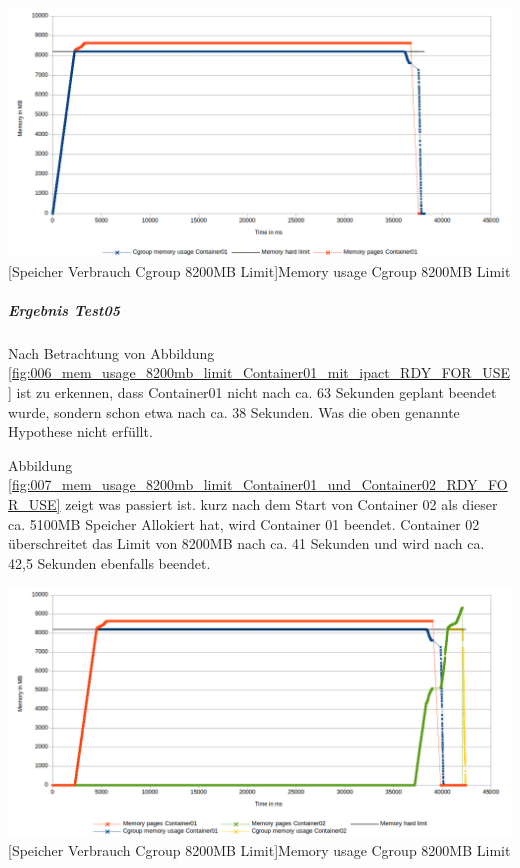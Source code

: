 \vspace{1em}
\begin{minipage}{\linewidth}
	\centering
	\includegraphics[width=1\linewidth]{pics/006_mem_usage_8200mb_limit_Container01_mit_ipact_RDY_FOR_USE.png}
	[Speicher Verbrauch Cgroup 8200MB Limit]{Memory usage Cgroup 8200MB Limit}
	\label{fig:006_mem_usage_8200mb_limit_Container01_mit_ipact_RDY_FOR_USE}
\end{minipage}

\subparagraph{Ergebnis Test05}
Nach Betrachtung von Abbildung \ref{fig:006_mem_usage_8200mb_limit_Container01_mit_ipact_RDY_FOR_USE} ist zu erkennen, dass Container01 nicht nach ca. 63 Sekunden geplant beendet wurde, sondern schon etwa nach ca. 38 Sekunden. Was die oben genannte Hypothese nicht erfüllt.

Abbildung \ref{fig:007_mem_usage_8200mb_limit_Container01_und_Container02_RDY_FOR_USE} zeigt was passiert ist. kurz nach dem Start von Container 02 als dieser ca. 5100MB Speicher Allokiert hat, wird Container 01 beendet. Container 02 überschreitet das Limit von 8200MB nach ca. 41 Sekunden und wird nach ca. 42,5 Sekunden ebenfalls beendet.

\vspace{1em}
\begin{minipage}{\linewidth}
	\centering
	\includegraphics[width=1\linewidth]{pics/007_mem_usage_8200mb_limit_Container01_und_Container02_RDY_FOR_USE.png}
	[Speicher Verbrauch Cgroup 8200MB Limit]{Memory usage Cgroup 8200MB Limit}
	\label{fig:007_mem_usage_8200mb_limit_Container01_und_Container02_RDY_FOR_USE}
\end{minipage}

